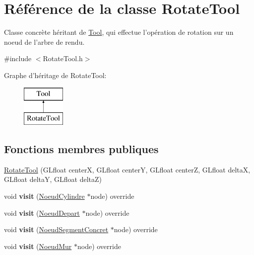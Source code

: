 \hypertarget{class_rotate_tool}{\section{Référence de la classe Rotate\-Tool}
\label{class_rotate_tool}
}


Classe concrète héritant de \hyperlink{class_tool}{Tool}, qui effectue l'opération de rotation sur un noeud de l'arbre de rendu.  




{\ttfamily \#include $<$Rotate\-Tool.\-h$>$}

Graphe d'héritage de Rotate\-Tool\-:\begin{figure}[H]
\begin{center}
\leavevmode
\includegraphics[height=2.000000cm]{class_rotate_tool}
\end{center}
\end{figure}
\subsection*{Fonctions membres publiques}
\begin{DoxyCompactItemize}
\item 
\hyperlink{group__inf2990_ga53087375f63f0e400fdd0bf569e90ad0}{Rotate\-Tool} (G\-Lfloat center\-X, G\-Lfloat center\-Y, G\-Lfloat center\-Z, G\-Lfloat delta\-X, G\-Lfloat delta\-Y, G\-Lfloat delta\-Z)
\item 
\hypertarget{group__inf2990_ga4142a7bdd90761c6dbda240a3fe62b5d}{void {\bfseries visit} (\hyperlink{class_noeud_cylindre}{Noeud\-Cylindre} $\ast$node) override}\label{group__inf2990_ga4142a7bdd90761c6dbda240a3fe62b5d}

\item 
\hypertarget{group__inf2990_ga9649bf652069731e900bb850bd3f8475}{void {\bfseries visit} (\hyperlink{class_noeud_depart}{Noeud\-Depart} $\ast$node) override}\label{group__inf2990_ga9649bf652069731e900bb850bd3f8475}

\item 
\hypertarget{group__inf2990_ga6a6b02897bd7b72119e7a4463d408d47}{void {\bfseries visit} (\hyperlink{class_noeud_segment_concret}{Noeud\-Segment\-Concret} $\ast$node) override}\label{group__inf2990_ga6a6b02897bd7b72119e7a4463d408d47}

\item 
\hypertarget{group__inf2990_gaa3542aa6a6a3f763a133b4003d30c41f}{void {\bfseries visit} (\hyperlink{class_noeud_mur}{Noeud\-Mur} $\ast$node) override}\label{group__inf2990_gaa3542aa6a6a3f763a133b4003d30c41f}

\end{DoxyCompactItemize}
